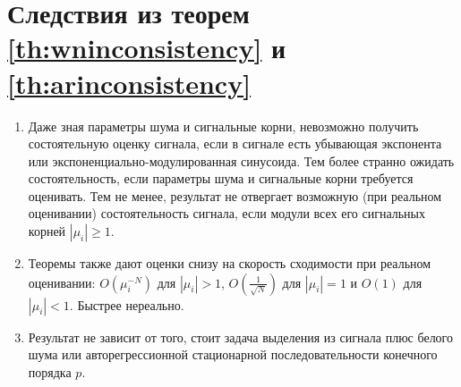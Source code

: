 \documentclass[12pt,a4paper]{article}
\begin{document}
\section{Следствия из теорем \ref{th:wninconsistency} и \ref{th:arinconsistency}}
\begin{enumerate}
	\item Даже зная параметры шума и сигнальные корни, невозможно получить состоятельную оценку сигнала, если в сигнале есть убывающая экспонента или экспоненциально-модулированная синусоида. Тем более странно ожидать состоятельность, если параметры шума и сигнальные корни требуется оценивать. Тем не менее, результат не отвергает возможную (при реальном оценивании) состоятельность сигнала, если модули всех его сигнальных корней $|\mu_i| \ge 1$.
	
	\item Теоремы также дают оценки снизу на скорость сходимости при реальном оценивании: $O(\mu_i^{-N})$ для $|\mu_i| > 1$, $O(\frac{1}{\sqrt{N}})$ для $|\mu_i| = 1$ и $O(1)$ для $|\mu_i| < 1$. Быстрее нереально.
	
	\item Результат не зависит от того, стоит задача выделения из сигнала плюс белого шума или авторегрессионной стационарной последовательности конечного порядка $p$.
\end{enumerate}


\end{document}
